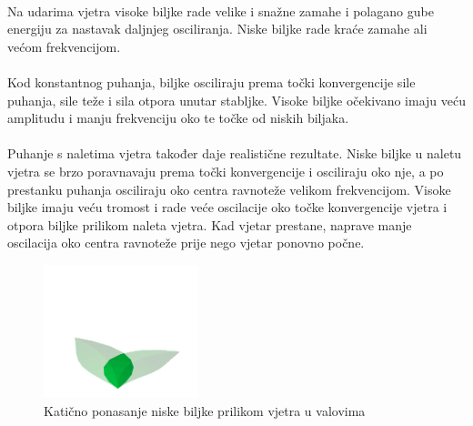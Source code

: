 \documentclass[times, utf8, diplomski]{fer}
\begin{document}
\paragraph{}
Na udarima vjetra visoke biljke rade velike i snažne zamahe i polagano gube 
energiju za nastavak daljnjeg osciliranja. Niske biljke rade kraće zamahe ali 
većom frekvencijom.
\paragraph{}
Kod konstantnog puhanja, biljke osciliraju prema točki konvergencije sile 
puhanja, sile teže i sila otpora unutar stabljke. Visoke biljke očekivano imaju veću 
amplitudu i manju frekvenciju oko te točke od niskih biljaka.
\paragraph{}
Puhanje s naletima vjetra također daje realistične rezultate. Niske biljke u 
naletu vjetra se brzo poravnavaju prema točki konvergencije i osciliraju oko 
nje, a po prestanku puhanja osciliraju oko centra ravnoteže velikom 
frekvencijom. Visoke biljke imaju veću tromost i rade veće oscilacije oko točke
konvergencije vjetra i otpora biljke prilikom naleta vjetra. Kad vjetar 
prestane, naprave manje oscilacija oko centra ravnoteže prije nego vjetar 
ponovno počne.
\begin{figure}[h]
	\centering
	\includegraphics[width=0.4\textwidth]{img/52-1}
	\caption{Katično ponasanje niske biljke prilikom vjetra u valovima}
	\label{fig:52-1}
\end{figure}
\end{document}

